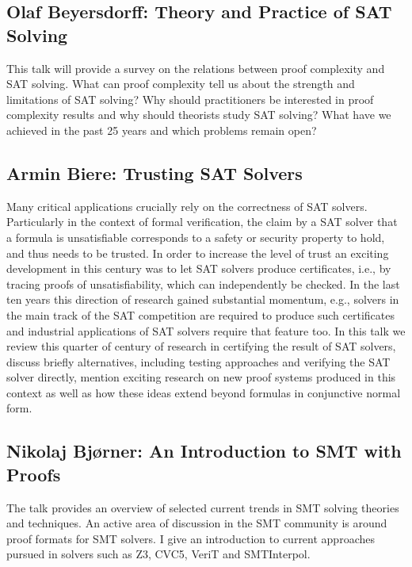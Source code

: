 \documentclass[11pt]{article}
\begin{document}
\subsection*{Olaf Beyersdorff: Theory and Practice of SAT Solving}\label{Beyersdorff}

This talk will provide a survey on the relations between proof complexity and SAT solving. What can proof complexity tell us about the strength and limitations of SAT solving? Why should practitioners be interested in proof complexity results and why should theorists study SAT solving? What have we achieved in the past 25 years and which problems remain open?


\subsection*{Armin Biere: Trusting SAT Solvers}\label{Biere}

Many critical applications crucially rely on the correctness of SAT solvers. Particularly in the context of formal verification, the claim by a SAT solver that a formula is unsatisfiable corresponds to a safety or security property to hold, and thus needs to be trusted.  In order to increase the level of trust an exciting development in this century was to let SAT solvers produce certificates, i.e., by tracing proofs of unsatisfiability, which can independently be checked.  In the last ten years this direction of research gained substantial momentum, e.g., solvers in the main track of the SAT competition are required to produce such certificates and industrial applications of SAT solvers require that feature too.  In this talk we review this quarter of century of research in certifying the result of SAT solvers, discuss briefly alternatives, including testing approaches and verifying the SAT solver directly, mention exciting research on new proof systems produced in this context as well as how these ideas extend beyond formulas in conjunctive normal form.


\subsection*{Nikolaj Bjørner: An Introduction to SMT with Proofs}\label{Bjorner}

The talk provides an overview of selected current trends in SMT solving theories and techniques. An active area of discussion in the SMT community is around proof formats for SMT solvers. I give an introduction to current approaches pursued in solvers such as Z3, CVC5, VeriT and SMTInterpol.
\end{document}
